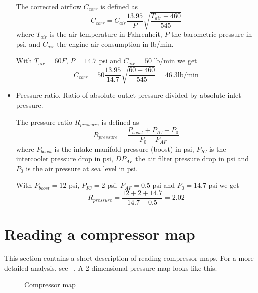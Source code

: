 \documentclass[11pt,a4paper]{book}
\newcommand{\Mfig}[1]{%
\begin{figure}[<+htpb+>]
    \centering
    \missingfigure{#1}
    \caption{#1}
\end{figure}}
\begin{document}
\begin{itemize}
        \begin{definition}
            The corrected airflow $C_{corr}$ is defined as
            \begin{equation}
                C_{corr}=C_{air}\frac{13.95}{P}\sqrt{\frac{T_{air} +460}{545}}
            \end{equation}
            where $T_{air}$ is the air temperature in Fahrenheit, $P$ the barometric pressure in
            psi, and $C_{air}$ the
            engine air consumption in lb/min.
            \label{def:corrected-airflow}
        \end{definition}
        \begin{example}
            With $T_{air}=60 F$, $P=14.7$ psi and $C_{air}=50$ lb/min we get
            \begin{equation}
                C_{corr}=50\frac{13.95}{14.7}\sqrt{\frac{60+460}{545}}=46.3\text{
                lb/min}
            \end{equation}
            \label{ex:corrected-airflow}
        \end{example}
    \item Pressure ratio. Ratio of absolute outlet pressure divided by absolute
        inlet pressure.
        \begin{definition}
            The pressure ratio $R_{pressure}$ is defined as
            \begin{equation}
                R_{pressure}=\frac{P_{boost}+P_{IC}+P_0}{P_0-P_{AF}}
            \end{equation}
            where $P_{boost}$ is the intake manifold pressure
            (boost) in psi, $P_{IC}$ is the intercooler pressure
            drop in psi,
            $DP_{AF}$ the air filter pressure drop in psi and $P_0$ is the air pressure
            at sea level in psi.
            \label{}
        \end{definition}
        \begin{example}
            With $P_{boost}=12$ psi, $P_{IC}=2$ psi, $P_{AF}=0.5$ psi and
            $P_0=14.7$ psi we get
            \begin{equation}
                R_{pressure}=\frac{12+2+14.7}{14.7-0.5}=2.02
                \label{}
            \end{equation}

        \end{example}
\end{itemize}
\section{Reading a compressor map}
This section contains a short description of reading compressor maps. For a more
detailed analysis, see
\citeauthor{isaac-lowry_turbo_2004}~\cite{isaac-lowry_turbo_2004}. A 2-dimensional pressure map looks like this.
\Mfig{Compressor map}
\end{document}
